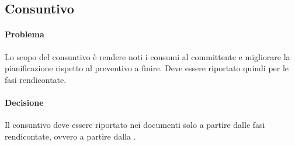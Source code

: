 \subsection{Consuntivo}
\paragraph{Problema} Lo scopo del consuntivo è rendere noti i consumi al committente e migliorare la pianificazione rispetto al preventivo a finire. Deve essere riportato quindi per le fasi rendicontate.
\paragraph{Decisione} Il consuntivo deve essere riportato nei documenti solo a partire dalle fasi rendicontate, ovvero a partire dalla \fPA.